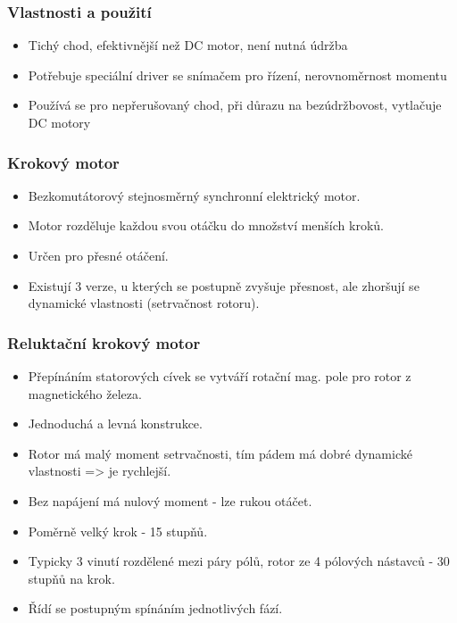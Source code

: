 \subsubsection*{Vlastnosti a použití}
\begin{itemize}
    \item Tichý chod, efektivnější než DC motor, není nutná údržba
    \item Potřebuje speciální driver se snímačem pro řízení, nerovnoměrnost momentu
    \item Používá se pro nepřerušovaný chod, při důrazu na bezúdržbovost, vytlačuje DC motory
\end{itemize}

\subsubsection*{Krokový motor}
\begin{itemize}
    \item Bezkomutátorový stejnosměrný synchronní elektrický motor.
    \item Motor rozděluje každou svou otáčku do množství menších kroků.
    \item Určen pro přesné otáčení.
    \item Existují 3 verze, u kterých se postupně zvyšuje přesnost, ale zhoršují se dynamické vlastnosti (setrvačnost rotoru).
\end{itemize}

\subsubsection*{Reluktační krokový motor}
\begin{itemize}
    \item Přepínáním statorových cívek se vytváří rotační mag. pole pro rotor z magnetického železa.
    \item Jednoduchá a levná konstrukce.
    \item Rotor má malý moment setrvačnosti, tím pádem má dobré dynamické vlastnosti => je rychlejší.
    \item Bez napájení má nulový moment - lze rukou otáčet.
    \item Poměrně velký krok - 15 stupňů.
    \item Typicky 3 vinutí rozdělené mezi páry pólů, rotor ze 4 pólových nástavců - 30 stupňů na krok.
    \item Řídí se postupným spínáním jednotlivých fází.
\end{itemize}

